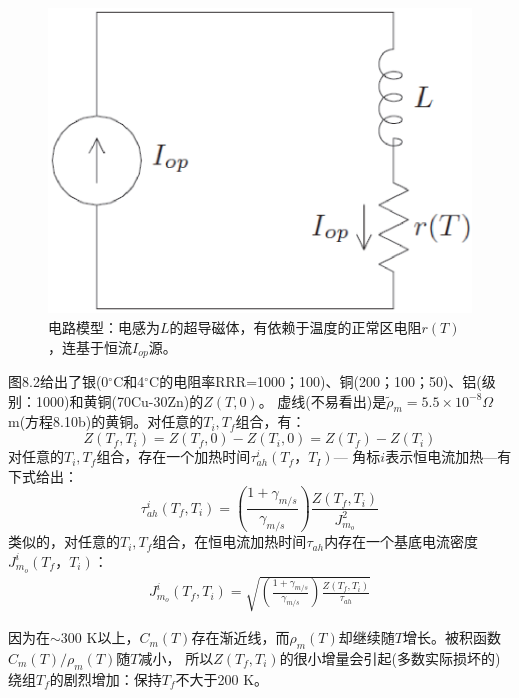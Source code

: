 \begin{figure}
	\centering
	\includegraphics[scale=0.5]{chpt8/figs/fig8.1.eps}
	\caption{电路模型：电感为$L$的超导磁体，有依赖于温度的正常区电阻$r(T)$，连基于恒流$I_{op}$源。}
\end{figure}
图8.2给出了银(0$^\circ$C和4$^\circ$C的电阻率RRR=1000；100)、铜(200；100；50)、铝(级别：1000)和黄铜(70Cu-30Zn)的$Z(T,0)$。
虚线(不易看出)是$\tilde{\rho}_m=5.5\times 10^{-8}\Omega$m(方程8.10b)的黄铜。对任意的$T_i,T_f$组合，有：
\begin{equation}%
Z(T_f,T_i)=Z(T_f,0)-Z(T_i,0)=Z(T_f)-Z(T_i)
\end{equation}
对任意的$T_i,T_f$组合，存在一个加热时间$\tau_{ah}^i(T_f，T_I)$---
角标$i$表示恒电流加热---有下式给出：
\begin{equation}%
\tau_{ah}^{i}(T_f,T_i)=\left(\frac{1+\gamma_{m/s}}{\gamma_{m/s}}\right)\frac{Z(T_f,T_i)}{J_{m_o}^{2}}
\end{equation}
类似的，对任意的$T_i,T_f$组合，在恒电流加热时间$\tau_{ah}$内存在一个基底电流密度$J_{m_o}^i(T_f，T_i)$：
\begin{align*}%
J_{m_o}^{i}(T_f,T_i)=\sqrt{\left(\frac{1+\gamma_{m/s}}{\gamma_{m/s}}\right)\frac{Z(T_f,T_i)}{\tau_{ah}}} \tag{8.12b}
\end{align*}

因为在$\sim 300$ K以上，$C_m(T)$存在渐近线，而$\rho_m(T)$却继续随$T$增长。被积函数$C_m(T)/\rho_m(T)$随$T$减小，
所以$Z(T_f,T_i)$的很小增量会引起(多数实际损坏的)绕组$T_f$的剧烈增加：保持$T_f$不大于200 K。

